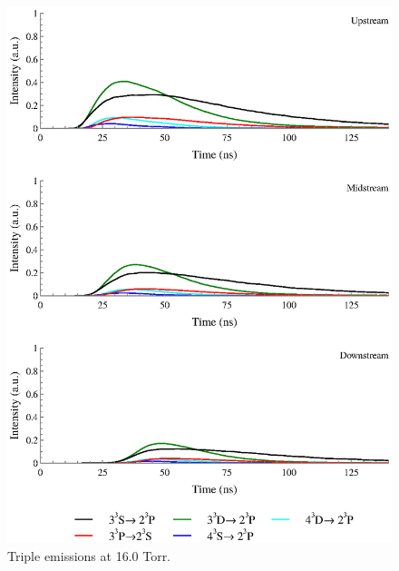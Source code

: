 \begin{figure}
  \centering
  \includegraphics{./chapters/extraem/figures/16torr_t.eps}
  \caption{Triple emissions at 16.0 Torr.}
\end{figure}
